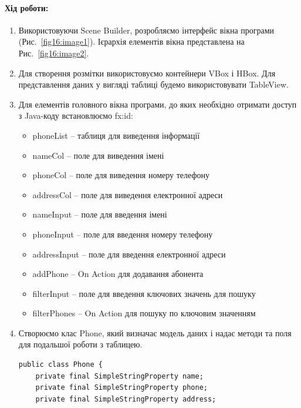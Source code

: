 \paragraph{Хід роботи:}
\begin{enumerate}

	\item Використовуючи Scene Builder, розробляємо інтерфейс вікна програми (Рис.~\ref{fig16:image1}). Ієрархія елементів вікна представлена на Рис.~\ref{fig16:image2}.
	\item Для створення розмітки використовуємо контейнери VBox і HBox. Для представлення даних у вигляді таблиці будемо використовувати TableView.
	\item Для елементів головного вікна програми, до яких необхідно отримати доступ з Java-коду встановлюємо fx:id:
	\begin{itemize}
		\item phoneList – таблиця для виведення інформації
		\item nameCol – поле для виведення імені
		\item phoneCol – поле для виведення номеру телефону
		\item addressCol – поле для виведення електронної адреси
		\item nameInput – поле для введення імені
		\item phoneInput – поле для введення номеру телефону
		\item addressInput – поле для введення електронної адреси
		\item addPhone – On Action для додавання абонента
		\item filterInput – поле для введення ключових значень для пошуку
		\item filterPhones – On Action для пошуку по ключовим значенням
	\end{itemize}
	\item Створюємо клас Phone, який визначає модель даних і надає методи та поля для подальшої роботи з таблицею.
\begin{verbatim}
public class Phone {
	private final SimpleStringProperty name;
	private final SimpleStringProperty phone;
	private final SimpleStringProperty address;
	

\end{verbatim}
\end{enumerate}
